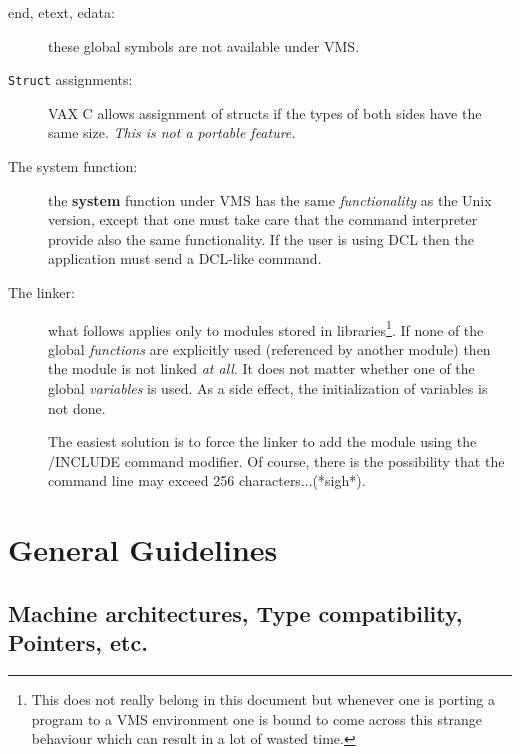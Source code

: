\begin{description}

\item[end, etext, edata:] these global symbols are not available under
 VMS.

\item[{\tt Struct} assignments:] VAX C allows assignment of structs if
 the types of both sides have the same size. {\em This is not a portable
feature.}

\item[The system function:]
the {\bf system} function under VMS has the same {\em functionality} as
the Unix version, except that one must take care that the command
interpreter provide also the same functionality. If the user is using
DCL then the application must send a DCL-like command.

\item[The linker:]
what follows applies only to modules stored in
 libraries\footnote{This
 does not really belong in this document but whenever one
 is porting a program to a VMS environment one is bound to come across
 this strange behaviour which can result in  a lot of wasted time.}.
If none of the global {\em functions} are explicitly used (referenced
by another module) then the
module is not linked {\em at all}. It does not matter whether one of the
global {\em variables} is used. As a side effect, the initialization
of variables is not done.

The easiest solution is to force the linker to add  the
module using the /INCLUDE command modifier. Of course, there is the
possibility that the command line may exceed 256 characters...(*sigh*).

\end{description}

\section{General Guidelines}

\subsection{Machine architectures, Type compatibility, Pointers, etc.}

